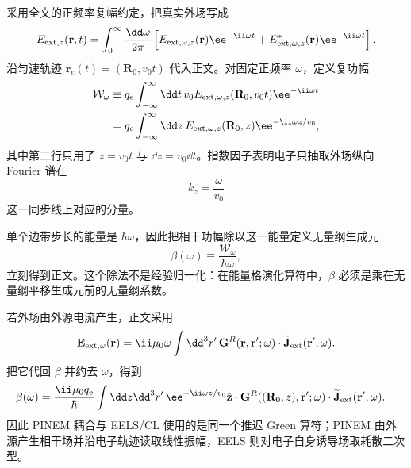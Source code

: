 

\begin{derivation}[外场做功与近场复耦合]
采用全文的正频率复幅约定，把真实外场写成
\[
E_{{\rm ext},z}(\mathbf r,t)
=\int_0^\infty\frac{\dd\omega}{2\pi}
\left[
E_{{\rm ext},\omega,z}(\mathbf r)\ee^{-\ii\omega t}
+E_{{\rm ext},\omega,z}^*(\mathbf r)\ee^{+\ii\omega t}
\right].
\]
沿匀速轨迹 $\mathbf r_e(t)=(\mathbf R_0,v_0t)$ 代入正文。对固定正频率 $\omega$，定义复功幅
\begin{align*}
\mathcal W_\omega
&\equiv
q_{\mathrm e}\int_{-\infty}^{\infty}\dd t\,
 v_0 E_{{\rm ext},\omega,z}(\mathbf R_0,v_0t)
 \ee^{-\ii\omega t}\\
&=q_{\mathrm e}\int_{-\infty}^{\infty}\dd z\,
 E_{{\rm ext},\omega,z}(\mathbf R_0,z)
 \ee^{-\ii\omega z/v_0},
\end{align*}
其中第二行只用了 $z=v_0t$ 与 $\dd z=v_0\dd t$。指数因子表明电子只抽取外场纵向 Fourier 谱在
\[
k_z=\frac{\omega}{v_0}
\]
这一同步线上对应的分量。

单个边带步长的能量是 $\hbar\omega$，因此把相干功幅除以这一能量定义无量纲生成元
\[
\beta(\omega)\equiv\frac{\mathcal W_\omega}{\hbar\omega},
\]
立刻得到正文。这个除法不是经验归一化：在能量格演化算符中，$\beta$ 必须是乘在无量纲平移生成元前的无量纲系数。

若外场由外源电流产生，正文采用
\[
\mathbf E_{{\rm ext},\omega}(\mathbf r)
=\ii\mu_0\omega
\int\dd^3r'\,
\mathbf G^R(\mathbf r,\mathbf r';\omega)
\cdot\widetilde{\mathbf J}_{\rm ext}(\mathbf r',\omega).
\]
把它代回 $\beta$ 并约去 $\omega$，得到
\begin{align*}
\beta(\omega)
={}&\frac{\ii\mu_0q_{\mathrm e}}{\hbar}
\int\dd z\dd^3r'\,
 \ee^{-\ii\omega z/v_0}
\hat{\mathbf z}\cdot
\mathbf G^R((\mathbf R_0,z),\mathbf r';\omega)
\cdot\widetilde{\mathbf J}_{\rm ext}(\mathbf r',\omega).
\end{align*}
因此 PINEM 耦合与 EELS/CL 使用的是同一个推迟 Green 算符；PINEM 由外源产生相干场并沿电子轨迹读取线性振幅，EELS 则对电子自身诱导场取耗散二次型。
\end{derivation}

